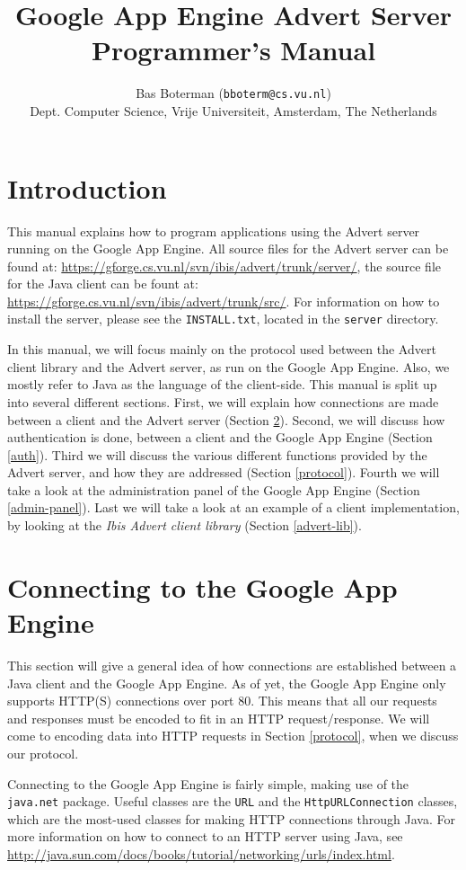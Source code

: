 \documentclass[a4paper,10pt]{article}
\title{Google App Engine Advert Server\\
       Programmer's Manual}
\author{
  Bas Boterman (\texttt{bboterm@cs.vu.nl})\\
  \small Dept. Computer Science, Vrije Universiteit, Amsterdam, The Netherlands
}
\begin{document}
\maketitle

\section{Introduction}
\label{introduction}
This manual explains how to program applications using the Advert server running
on the Google App Engine. All source files for the Advert server can be found at:
\url{https://gforge.cs.vu.nl/svn/ibis/advert/trunk/server/}, the source file for
the Java client can be fount at:
\url{https://gforge.cs.vu.nl/svn/ibis/advert/trunk/src/}. For information on how
to install the server, please see the \texttt{INSTALL.txt}, located in the
\texttt{server} directory.

In this manual, we will focus mainly on the protocol used between the Advert
client library and the Advert server, as run on the Google App Engine. Also, we
mostly refer to Java as the language of the client-side. This manual is split up into
several different sections. First, we will explain how connections are made
between a client and the Advert server (Section \ref{http-java}). Second, we
will
discuss how authentication is done, between a client and the Google App Engine
(Section \ref{auth}). Third we will discuss the various different functions
provided by the Advert server, and how they are addressed (Section
\ref{protocol}). Fourth we will take a look at the administration panel of the
Google App Engine (Section \ref{admin-panel}). Last we will take a look at an
example of a client implementation, by looking at the \emph{Ibis Advert
client library} (Section \ref{advert-lib}).

\section{Connecting to the Google App Engine}
\label{http-java}
This section will give a general idea of how connections are established
between a Java client and the Google App Engine. As of yet, the Google App
Engine only supports HTTP(S) connections over port 80. This means that all our
requests and responses must be encoded to fit in an HTTP request/response. We
will come to encoding data into HTTP requests in Section \ref{protocol}, when
we discuss our protocol.

Connecting to the Google App Engine is fairly simple, making use of the
\texttt{java.net} package. Useful classes are the \texttt{URL} and the
\texttt{HttpURLConnection} classes, which are the most-used classes for making
HTTP connections through Java. For more information on how to connect to an
HTTP server using Java, see
\url{http://java.sun.com/docs/books/tutorial/networking/urls/index.html}.
\end{document}
